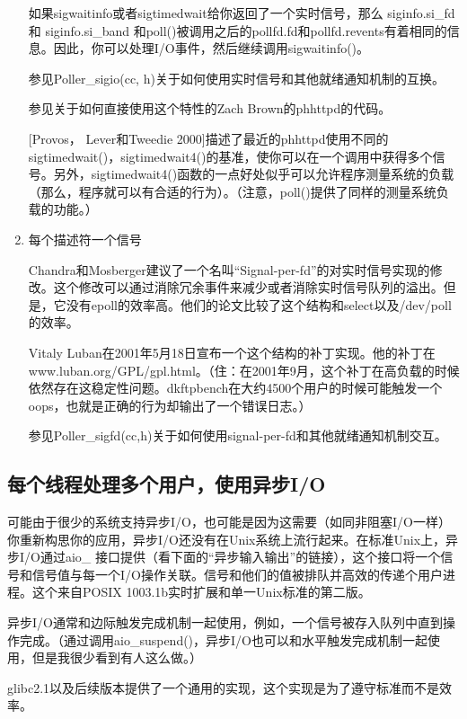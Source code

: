 \documentclass[12pt, twoside, a4paper, xetex]{report}
\begin{document}
\begin{enumerate}
		如果sigwaitinfo或者sigtimedwait给你返回了一个实时信号，那么 siginfo.si\_fd 和 siginfo.si\_band 和poll()被调用之后的pollfd.fd和pollfd.revents有着相同的信息。因此，你可以处理I/O事件，然后继续调用sigwaitinfo()。

		参见Poller\_sigio(cc, h)关于如何使用实时信号和其他就绪通知机制的互换。

		参见关于如何直接使用这个特性的Zach Brown的phhttpd的代码。

		[Provos， Lever和Tweedie 2000]描述了最近的phhttpd使用不同的sigtimedwait()，sigtimedwait4()的基准，使你可以在一个调用中获得多个信号。另外，sigtimedwait4()函数的一点好处似乎可以允许程序测量系统的负载（那么，程序就可以有合适的行为）。（注意，poll()提供了同样的测量系统负载的功能。）

	\item  每个描述符一个信号

		Chandra和Mosberger建议了一个名叫“Signal-per-fd”的对实时信号实现的修改。这个修改可以通过消除冗余事件来减少或者消除实时信号队列的溢出。但是，它没有epoll的效率高。他们的论文比较了这个结构和select以及/dev/poll的效率。

		Vitaly Luban在2001年5月18日宣布一个这个结构的补丁实现。他的补丁在\\www.luban.org/GPL/gpl.html。（住：在2001年9月，这个补丁在高负载的时候依然存在这稳定性问题。dkftpbench在大约4500个用户的时候可能触发一个oops，也就是正确的行为却输出了一个错误日志。）
		
		参见Poller\_sigfd(cc,h)关于如何使用signal-per-fd和其他就绪通知机制交互。
	\end{enumerate}
 
\subsection*{每个线程处理多个用户，使用异步I/O}
		
	可能由于很少的系统支持异步I/O，也可能是因为这需要（如同非阻塞I/O一样）你重新构思你的应用，异步I/O还没有在Unix系统上流行起来。在标准Unix上，异步I/O通过aio\_ 接口提供（看下面的“异步输入输出”的链接），这个接口将一个信号和信号值与每一个I/O操作关联。信号和他们的值被排队并高效的传递个用户进程。这个来自POSIX 1003.1b实时扩展和单一Unix标准的第二版。

	异步I/O通常和边际触发完成机制一起使用，例如，一个信号被存入队列中直到操作完成。（通过调用aio\_suspend()，异步I/O也可以和水平触发完成机制一起使用，但是我很少看到有人这么做。）

	glibc2.1以及后续版本提供了一个通用的实现，这个实现是为了遵守标准而不是效率。
\end{document}
